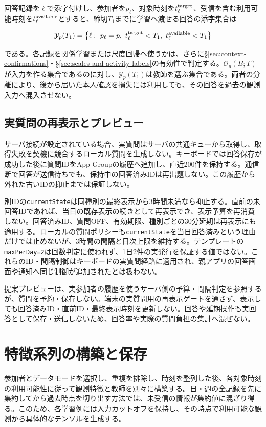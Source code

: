 回答記録を\(\ell\)で添字付けし、参加者を\(p_\ell\)、対象時刻を\(t_\ell^{\rm target}\)、受信を含む利用可能時刻を\(t_\ell^{\rm available}\)とすると、締切\(T_1\)までに学習へ渡せる回答の添字集合は

\[
\mathcal Y_p(T_1)=
\left\{\ell:\ p_\ell=p,\
t_\ell^{\rm target}<T_1,\ t_\ell^{\rm available}<T_1\right\}
\]

である。各記録を関係学習または尺度回帰へ使うかは、さらに§\ref{sec:context-confirmations}・§\ref{sec:scales-and-activity-labels}の有効性で判定する。\(\mathcal O_p(B;T)\)が入力を作る集合であるのに対し、\(\mathcal Y_p(T_1)\)は教師を選ぶ集合である。両者の分離により、後から届いた本人確認を損失には利用しても、その回答を過去の観測入力へ混入させない。

\subsection{実質問の再表示とプレビュー}

サーバ接続が設定されている場合、実質問はサーバの共通キューから取得し、取得失敗を契機に競合するローカル質問を生成しない。キーボードでは回答保存が成功した後に質問IDをApp Groupの履歴へ追加し、直近200件を保持する。通信断で回答が送信待ちでも、保持中の回答済みIDは再出題しない。この履歴から外れた古いIDの抑止までは保証しない。

別IDの\texttt{currentState}は同種別の最終表示から3時間未満なら抑止する。直前の未回答IDであれば、当日の既存表示の続きとして再表示でき、表示予算を再消費しない。回答済みID、質問OFF、有効期限、種別ごとの30分延期は再表示にも適用する。ローカルの質問ポリシーも\texttt{currentState}を当日回答済みという理由だけでは止めないが、3時間の間隔と日次上限を維持する。テンプレートの\texttt{maxPerDay=2}は回数判定に使われず、1日2件の実発行を保証する値ではない。これらのID・間隔制御はキーボードの実質問経路に適用され、親アプリの回答画面や通知へ同じ制御が追加されたとは扱わない。

提案プレビューは、実参加者の履歴を使うサーバ側の予算・間隔判定を参照するが、質問を予約・保存しない。端末の実質問用の再表示ゲートを通さず、表示しても回答済みID・直前ID・最終表示時刻を更新しない。回答や延期操作も実回答として保存・送信しないため、回答率や実際の質問負担の集計へ混ぜない。

\section{特徴系列の構築と保存}

参加者とデータモードを選択し、重複を排除し、時刻を整列した後、各対象時刻の利用可能性に従って観測特徴と教師を別々に構築する。日・週の全記録を先に集約してから過去時点を切り出す方法では、未受信の情報が集約値に混ざり得る。このため、各学習例には入力カットオフを保持し、その時点で利用可能な観測から具体的なテンソルを生成する。

